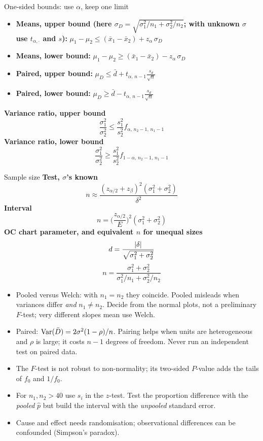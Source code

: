 \begin{formulabox}{One-sided bounds: use $\alpha$, keep one limit}
\begin{itemize}
  \item \textbf{Means, upper bound (here $\sigma_D=\sqrt{\sigma_1^2/n_1+\sigma_2^2/n_2}$; with unknown $\sigma$ use $t_{\alpha,\cdot}$ and $s$):} $\mu_1-\mu_2\le(\bar{x}_1-\bar{x}_2)+z_\alpha\,\sigma_D$
  \item \textbf{Means, lower bound:} $\mu_1-\mu_2\ge(\bar{x}_1-\bar{x}_2)-z_\alpha\,\sigma_D$
  \item \textbf{Paired, upper bound:} $\mu_D\le\bar{d}+t_{\alpha,\,n-1}\tfrac{s_d}{\sqrt n}$
  \item \textbf{Paired, lower bound:} $\mu_D\ge\bar{d}-t_{\alpha,\,n-1}\tfrac{s_d}{\sqrt n}$
\end{itemize}
\textbf{Variance ratio, upper bound}
\[ \frac{\sigma_1^2}{\sigma_2^2}\le\frac{s_1^2}{s_2^2}f_{\alpha,\,n_2-1,\,n_1-1} \]
\textbf{Variance ratio, lower bound}
\[ \frac{\sigma_1^2}{\sigma_2^2}\ge\frac{s_1^2}{s_2^2}f_{1-\alpha,\,n_2-1,\,n_1-1} \]
\end{formulabox}

\begin{formulabox}{Sample size}
\textbf{Test, $\sigma$'s known}
\[ n\approx\frac{(z_{\alpha/2}+z_\beta)^2(\sigma_1^2+\sigma_2^2)}{\delta^2} \]
\textbf{Interval}
\[ n=\Big(\frac{z_{\alpha/2}}{E}\Big)^2(\sigma_1^2+\sigma_2^2) \]
\textbf{OC chart parameter, and equivalent $n$ for unequal sizes}
\[ d=\frac{\lvert\delta\rvert}{\sqrt{\sigma_1^2+\sigma_2^2}} \]
\[ n=\frac{\sigma_1^2+\sigma_2^2}{\sigma_1^2/n_1+\sigma_2^2/n_2} \]
\end{formulabox}

\begin{notebox}
\begin{itemize}
  \item Pooled versus Welch: with $n_1=n_2$ they coincide. Pooled misleads when variances differ \emph{and} $n_1\ne n_2$. Decide from the normal plots, not a preliminary $F$-test; very different slopes mean use Welch.
  \item Paired: $\operatorname{Var}(\bar{D})=2\sigma^2(1-\rho)/n$. Pairing helps when units are heterogeneous and $\rho$ is large; it costs $n-1$ degrees of freedom. Never run an independent test on paired data.
  \item The $F$-test is not robust to non-normality; its two-sided $P$-value adds the tails of $f_0$ and $1/f_0$.
  \item For $n_1,n_2>40$ use $s_i$ in the $z$-test. Test the proportion difference with the \emph{pooled} $\hat{p}$ but build the interval with the \emph{unpooled} standard error.
  \item Cause and effect needs randomisation; observational differences can be confounded (Simpson's paradox).
\end{itemize}
\end{notebox}


